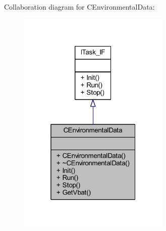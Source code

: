 Collaboration diagram for C\+Environmental\+Data\+:
\nopagebreak
\begin{figure}[H]
\begin{center}
\leavevmode
\includegraphics[width=205pt]{class_c_environmental_data__coll__graph}
\end{center}
\end{figure}
